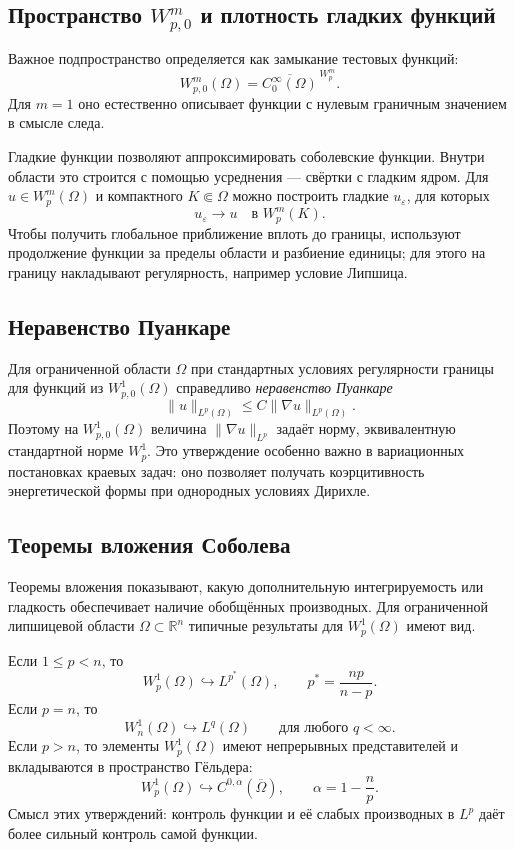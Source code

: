 \subsection[Пространство Wp0m и плотность гладких функций]{Пространство $W_{p,0}^m$ и плотность гладких функций}

Важное подпространство определяется как замыкание тестовых функций:
\[
    W_{p,0}^m(\Omega)
    =\overline{C_0^\infty(\Omega)}^{\,W_p^m}.
\]
Для $m=1$ оно естественно описывает функции с нулевым граничным значением в
смысле следа.

Гладкие функции позволяют аппроксимировать соболевские функции. Внутри области
это строится с помощью усреднения --- свёртки с гладким ядром. Для
$u\in W_p^m(\Omega)$ и компактного $K\Subset\Omega$ можно построить гладкие
$u_\varepsilon$, для которых
\[
    u_\varepsilon\to u
    \quad\text{в }W_p^m(K).
\]
Чтобы получить глобальное приближение вплоть до границы, используют продолжение
функции за пределы области и разбиение единицы; для этого на границу накладывают
регулярность, например условие Липшица.

\subsection{Неравенство Пуанкаре}

Для ограниченной области $\Omega$ при стандартных условиях регулярности границы
для функций из $W_{p,0}^1(\Omega)$ справедливо \emph{неравенство Пуанкаре}
\[
    \|u\|_{L^p(\Omega)}
    \leq C\|\nabla u\|_{L^p(\Omega)}.
\]
Поэтому на $W_{p,0}^1(\Omega)$ величина $\|\nabla u\|_{L^p}$ задаёт норму,
эквивалентную стандартной норме $W_p^1$. Это утверждение особенно важно в
вариационных постановках краевых задач: оно позволяет получать коэрцитивность
энергетической формы при однородных условиях Дирихле.

\subsection{Теоремы вложения Соболева}

Теоремы вложения показывают, какую дополнительную интегрируемость или гладкость
обеспечивает наличие обобщённых производных. Для ограниченной липшицевой области
$\Omega\subset\mathbb R^n$ типичные результаты для $W_p^1(\Omega)$ имеют вид.

Если $1\leq p<n$, то
\[
    W_p^1(\Omega)\hookrightarrow L^{p^*}(\Omega),
    \qquad
    p^*=\frac{np}{n-p}.
\]
Если $p=n$, то
\[
    W_n^1(\Omega)\hookrightarrow L^q(\Omega)
    \qquad\text{для любого }q<\infty.
\]
Если $p>n$, то элементы $W_p^1(\Omega)$ имеют непрерывных представителей и
вкладываются в пространство Гёльдера:
\[
    W_p^1(\Omega)\hookrightarrow C^{0,\alpha}(\overline\Omega),
    \qquad
    \alpha=1-\frac np.
\]
Смысл этих утверждений: контроль функции и её слабых производных в $L^p$
даёт более сильный контроль самой функции.

